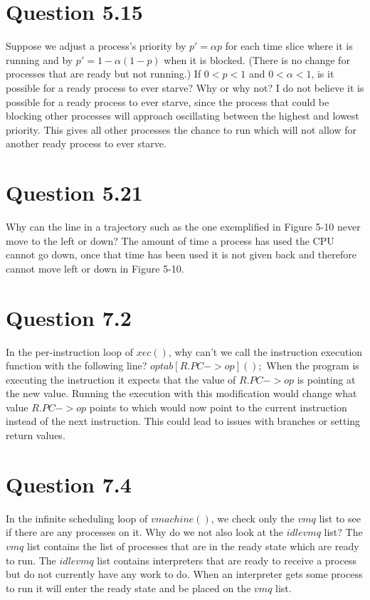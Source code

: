 \documentclass{article}
\begin{document}
\section*{Question 5.15}
Suppose we adjust a process's priority by $p' = \alpha p$ for each time slice where it is running and by $p' = 1 - \alpha (1-p)$ when it is blocked.
(There is no change for processes that are ready but not running.)
If $0<p<1$ and $0<\alpha<1$, is it possible for a ready process to ever starve? Why or why not?
\newline
\newline
I do not believe it is possible for a ready process to ever starve, since the process that could be blocking other processes will approach oscillating between the highest and lowest priority. This gives all other processes the chance to run which will not allow for another ready process to ever starve.

\section*{Question 5.21}
Why can the line in a trajectory such as the one exemplified in Figure 5-10 never move to the left or down?
\newline
\newline
The amount of time a process has used the CPU cannot go down, once that time has been used it is not given back and therefore cannot move left or down in Figure 5-10.

\section*{Question 7.2}
In the per-instruction loop of $xec()$, why can't we call the instruction execution function with the following line? $optab[R.PC->op]();$
\newline
\newline
When the program is executing the instruction it expects that the value of $R.PC->op$ is pointing at the new value.
Running the execution with this modification would change what value $R.PC->op$ points to which would now point to the current instruction instead of the next instruction. This could lead to issues with branches or setting return values.

\section*{Question 7.4}
In the infinite scheduling loop of $vmachine()$, we check only the $vmq$ list to see if there are any processes on it. Why do we not also look at the $idlevmq$ list?
\newline
\newline
The $vmq$ list contains the list of processes that are in the ready state which are ready to run. The $idlevmq$ list contains interpreters that are ready to receive a process but do not currently have any work to do. When an interpreter gets some process to run it will enter the ready state and be placed on the $vmq$ list.
\end{document}
